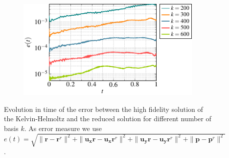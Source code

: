 \begin{figure}[t]
\centering
\begin{subfigure}[]{0.48\linewidth}
          \includegraphics[scale=1]{Figures/paper-figure4.pdf}
\end{subfigure}
\caption{Evolution in time of the error  between the high fidelity solution of the Kelvin-Helmoltz and the reduced solution for different number of basis $k$. As error measure we use $e(t)=\sqrt{\|\mathbf{r}-\mathbf{r}^r\|^2+\|\mathbf{u_xr}-\mathbf{u_xr}^r\|^2 + \|\mathbf{u_yr}-\mathbf{u_yr}^r\|^2 + \|\mathbf{p}-\mathbf{p}^r\|^2}$.}
\label{fig:error_decay_KH}
\end{figure}

